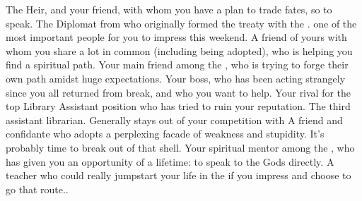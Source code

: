 \documentclass[char]{GL2020}
\begin{document}
\begin{contacts}
    \contact{\cHeir{}} The \cHeir{\formal} Heir, and your friend, with whom you have a plan to trade fates, so to speak.
    \contact{\cDiplomat{}} The Diplomat from \pTech{} who originally formed the treaty with the \pFarm{}. \cDiplomat{\Theyare} one of the most important people for you to impress this weekend.
    \contact{\cScholarship{}} A friend of yours with whom you share a lot in common (including being adopted), who is helping you find a spiritual path.
    \contact{\cWarlordDaughter{}} Your main friend among the \pShippies{}, who is trying to forge their own path amidst huge expectations.
    \contact {\cLibrarian{}} Your boss, who has been acting strangely since you all returned from break, and who you want to help.
    \contact{\cLibAssist{}} Your rival for the top Library Assistant position who has tried to ruin your reputation.
    \contact{\cPresident{}} The third assistant librarian. Generally stays out of your competition with \cLibAssist{}
    \contact{\cChupStudent{}} A friend and confidante who adopts a perplexing facade of weakness and stupidity. It's probably time to break \cChupStudent{\them} out of that shell.
    \contact{\cFlowPriest{}} Your spiritual mentor among the \pShippies{}, who has given you an opportunity of a lifetime: to speak to the Gods directly.
    \contact{\cPrince{}} A \pFarm{} teacher who could really jumpstart your life in the \pFarm{} if you impress \cPrince{\them} and choose to go that route..
\end{contacts}
\end{document}

